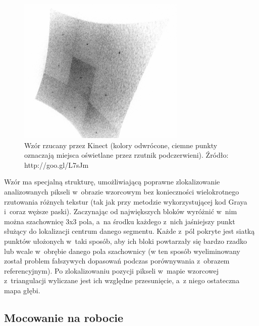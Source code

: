 \begin{figure}[h!]
\centering
\includegraphics[width=8cm]{../img/kinect_pattern}
\caption[Wzór rzucany przez Kinect]{Wzór rzucany przez Kinect (kolory odwrócone,
ciemne punkty oznaczają miejsca oświetlane przez rzutnik podczerwieni). Źródło:
http://goo.gl/L7sJm}
\label{fig:kinect_pattern}
\end{figure}

Wzór ma specjalną strukturę, umożliwiającą poprawne zlokalizowanie analizowanych
pikseli w~obrazie wzorcowym bez konieczności wielokrotnego rzutowania różnych
tekstur (tak jak przy metodzie wykorzystującej kod Graya i~coraz węższe paski).
Zaczynając od największych bloków wyróżnić w~nim można szachownicę 3x3 pola, 
a~na środku każdego z~nich jaśniejszy punkt służący do lokalizacji centrum danego
segmentu. Każde z~pól pokryte jest siatką punktów ułożonych w~taki sposób, aby
ich bloki powtarzały się bardzo rzadko lub wcale w~obrębie danego pola
szachownicy (w ten sposób wyeliminowany został problem fałszywych dopasowań
podczas porównywania z~obrazem referencyjnym). Po zlokalizowaniu pozycji
pikseli w~mapie wzorcowej z~triangulacji wyliczane jest ich względne
przesunięcie, a~z niego ostateczna mapa głębi.

\subsection{Mocowanie na robocie}

